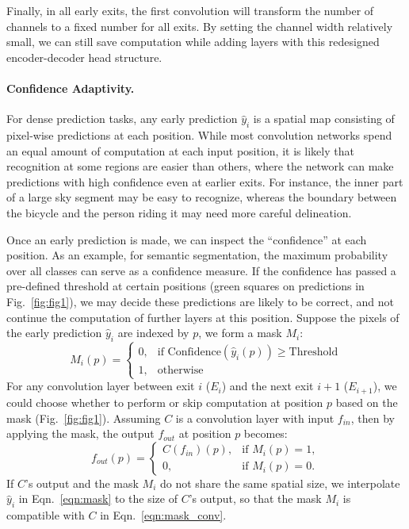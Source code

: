 \documentclass{article} %
\begin{document}
Finally, in all early exits, the first convolution will transform the number of channels to a fixed number for all exits.
By setting the channel width relatively small, we can still save computation while adding layers with this redesigned encoder-decoder head structure.

\paragraph{Confidence Adaptivity.}
For dense prediction tasks, any early prediction $\hat{y}_i$ is a spatial map consisting of pixel-wise predictions at each position.
While most convolution networks spend an equal amount of computation at each input position, it is likely that recognition at some regions are easier than others, where the network can make predictions with high confidence even at earlier exits.
For instance, the inner part of a large sky segment may be easy to recognize, whereas the boundary between the bicycle and the person riding it may need more careful delineation.

Once an early prediction is made, we can inspect the ``confidence'' at each position.
As an example, for semantic segmentation, the maximum probability over all classes can serve as a confidence measure.
If the confidence has passed a pre-defined threshold at certain positions (green squares on predictions in Fig.~\ref{fig:fig1}), we may decide these predictions are likely to be correct, and not continue the computation of further layers at this position.
Suppose the pixels of the early prediction $\hat{y}_i$ are indexed by $p$, we form a mask $M_i$:
\begin{equation}
\label{eqn:mask}
M_i(p) = 
\begin{cases}
    0, & \text{if Confidence}(\hat{y}_i (p)) \geq \text{Threshold} \\
    1,              & \text{otherwise}
\end{cases}
\end{equation}
For any convolution layer between exit $i$ ($E_i$) and the next exit $i+1$ ($E_{i+1}$), we could choose whether to perform or skip computation at position $p$ based on the mask (Fig.~\ref{fig:fig1}).
Assuming $C$ is a convolution layer with input $f_{in}$, then by applying the mask, the output $f_{out}$ at position $p$ becomes:
\begin{equation}
\label{eqn:mask_conv}
f_{out}(p)  = 
\begin{cases}
    C(f_{in})(p), & \text{if } M_i(p) = 1, \\
    0,  & \text{if } M_i(p) = 0.
\end{cases}
\end{equation}
If $C$'s output and the mask $M_i$ do not share the same spatial size, we interpolate $\hat{y}_i$ in Eqn.~\ref{eqn:mask} to the size of $C$'s output, so that the mask $M_i$ is compatible with $C$ in Eqn.~\ref{eqn:mask_conv}.
\end{document}
